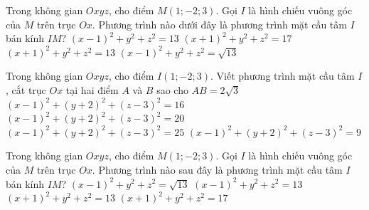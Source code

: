 \begin{ex}%
	Trong không gian $Oxyz$, cho điểm $M(1;-2;3)$. Gọi $I$ là hình chiếu vuông góc của $M$ trên trục $Ox$. Phương trình nào dưới đây là phương trình mặt cầu tâm $I$ bán kính $IM$?
	\choice
	{\True $(x-1)^2+y^2+z^2=13$}
	{$(x+1)^2+y^2+z^2=17$}
	{$(x+1)^2+y^2+z^2=13$}
	{$(x-1)^2+y^2+z^2=\sqrt{13}$}
\end{ex}

\begin{ex}%
	Trong không gian $Oxyz$, cho điểm $I(1;-2;3)$. Viết phương trình mặt cầu tâm $I$, cắt trục $Ox$ tại hai điểm $A$ và $B$ sao cho $AB=2\sqrt{3}$
	\choice
	{\True $(x-1)^2+(y+2)^2+(z-3)^2=16$}
	{$(x-1)^2+(y+2)^2+(z-3)^2=20$}
	{$(x-1)^2+(y+2)^2+(z-3)^2=25$}
	{$(x-1)^2+(y+2)^2+(z-3)^2=9$}
\end{ex}

\begin{ex}%
	Trong không gian $Oxyz$, cho điểm $M(1;-2;3)$. Gọi $I$ là hình chiếu vuông góc của $M$ trên trục $Ox$. Phương trình nào sau đây là phương trình mặt cầu tâm $I$ bán kính $IM$?
	\choice
	{$(x-1)^2+y^2+z^2=\sqrt{13}$}
	{\True $(x-1)^2+y^2+z^2=13$}
	{$(x+1)^2+y^2+z^2=13$}
	{$(x+1)^2+y^2+z^2=17$}
\end{ex}

